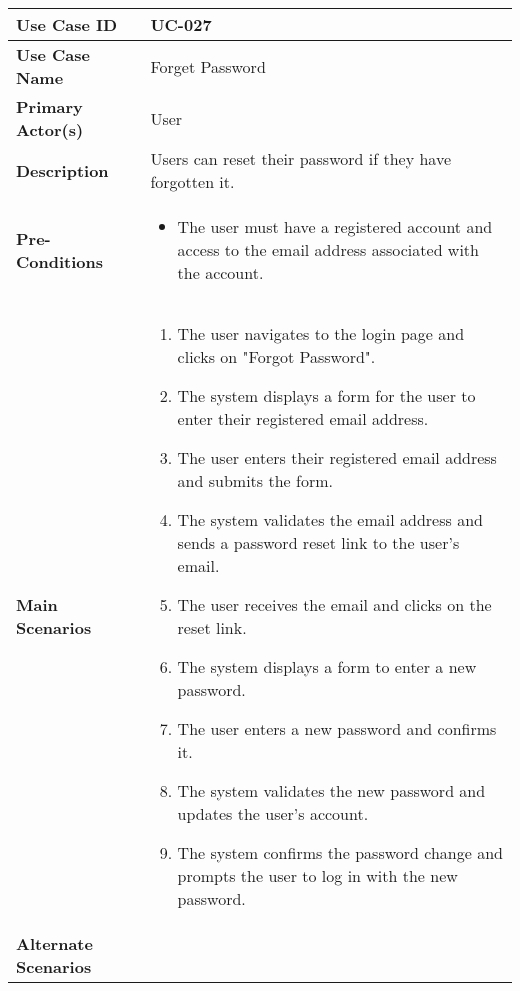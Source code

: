 \begin{table}[!ht]
    \centering
    \renewcommand{\arraystretch}{1.3} %
    \begin{tabularx}{\textwidth}{|l|X|}
        \hline
        \textbf{Use Case ID} & UC-027 \\
        \hline
        \textbf{Use Case Name} & Forget Password \\
        \hline
        \textbf{Primary Actor(s)} & User \\
        \hline
        \textbf{Description} & Users can reset their password if they have forgotten it. \\
        \hline
        \textbf{Pre-Conditions} & 
        \begin{itemize}[label=--,itemsep=0pt]
            \item The user must have a registered account and access to the email address associated with the account.
        \end{itemize} \\
        \hline
        \textbf{Main Scenarios} & 
        \begin{enumerate}[label=\arabic*.,itemsep=0pt]
            \item The user navigates to the login page and clicks on "Forgot Password".
            \item The system displays a form for the user to enter their registered email address.
            \item The user enters their registered email address and submits the form.
            \item The system validates the email address and sends a password reset link to the user's email.
            \item The user receives the email and clicks on the reset link.
            \item The system displays a form to enter a new password.
            \item The user enters a new password and confirms it.
            \item The system validates the new password and updates the user's account.
            \item The system confirms the password change and prompts the user to log in with the new password.
        \end{enumerate} \\
        \hline
        \textbf{Alternate Scenarios} & 
        \begin{enumerate}[label=--,itemsep=0pt]

\end{enumerate}
\end{tabularx}
\end{table}
